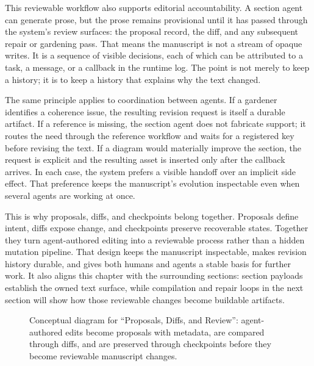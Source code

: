 This reviewable workflow also supports editorial accountability. A section agent can generate prose, but the prose remains provisional until it has passed through the system's review surfaces: the proposal record, the diff, and any subsequent repair or gardening pass. That means the manuscript is not a stream of opaque writes. It is a sequence of visible decisions, each of which can be attributed to a task, a message, or a callback in the runtime log. The point is not merely to keep a history; it is to keep a history that explains why the text changed.

The same principle applies to coordination between agents. If a gardener identifies a coherence issue, the resulting revision request is itself a durable artifact. If a reference is missing, the section agent does not fabricate support; it routes the need through the reference workflow and waits for a registered key before revising the text. If a diagram would materially improve the section, the request is explicit and the resulting asset is inserted only after the callback arrives. In each case, the system prefers a visible handoff over an implicit side effect. That preference keeps the manuscript's evolution inspectable even when several agents are working at once.

This is why proposals, diffs, and checkpoints belong together. Proposals define intent, diffs expose change, and checkpoints preserve recoverable states. Together they turn agent-authored editing into a reviewable process rather than a hidden mutation pipeline. That design keeps the manuscript inspectable, makes revision history durable, and gives both humans and agents a stable basis for further work. It also aligns this chapter with the surrounding sections: section payloads establish the owned text surface, while compilation and repair loops in the next section will show how those reviewable changes become buildable artifacts.

\begin{figure}[htbp]
\centering

\caption{Conceptual diagram for ``Proposals, Diffs, and Review'': agent-authored edits become proposals with metadata, are compared through diffs, and are preserved through checkpoints before they become reviewable manuscript changes.}
\end{figure}

